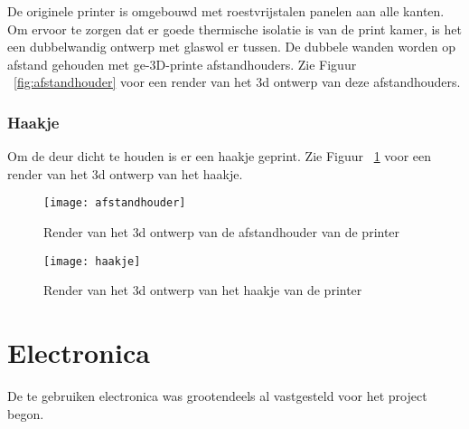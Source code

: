 De originele printer is omgebouwd met roestvrijstalen panelen aan alle kanten.
Om ervoor te zorgen dat er goede thermische isolatie is van de print kamer, is
het een dubbelwandig ontwerp met glaswol er tussen. De dubbele wanden worden op
afstand gehouden met ge-3D-printe afstandhouders. Zie Figuur
~\ref{fig:afstandhouder} voor een render van het \ac{3d} ontwerp van deze
afstandhouders.

\subsubsection{Haakje}

Om de deur dicht te houden is er een haakje geprint. Zie Figuur
~\ref{fig:haakje} voor een render van het \ac{3d} ontwerp van het haakje.

\begin{figure}[h]
    \centering
    \begin{minipage}{0.45\textwidth}
        \centerline{\texttt{[image: afstandhouder]}}
        \caption{Render van het \ac{3d} ontwerp van de afstandhouder van de printer}
        \label{fig:afstandhouder}
    \end{minipage}\hfill
    \begin{minipage}{0.45\textwidth}
        \centerline{\texttt{[image: haakje]}}
        \caption{Render van het \ac{3d} ontwerp van het haakje van de printer}
        \label{fig:haakje}
    \end{minipage}
\end{figure}

\section{Electronica}

De te gebruiken electronica was grootendeels al vastgesteld voor het project begon.


